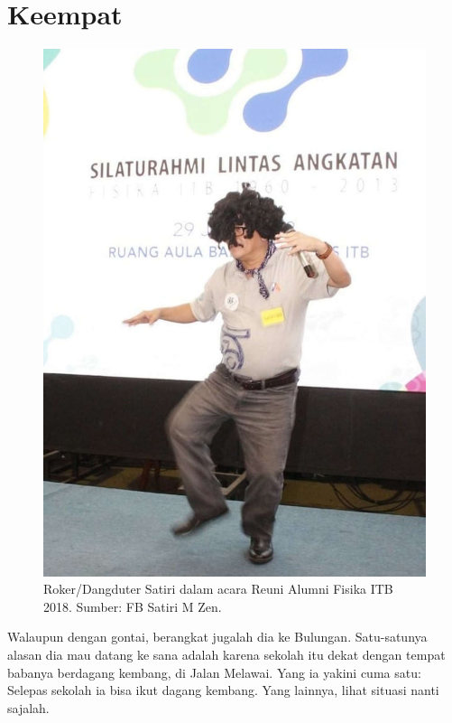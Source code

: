 
\chapter{Keempat}

\begin{figure}[htbp]
\centerline{\includegraphics[scale=1.0]{01-04-01}}
\caption{ Roker/Dangduter Satiri dalam acara Reuni Alumni Fisika ITB 2018. Sumber: FB Satiri M Zen.}
\label{01-04-01}
\end{figure}
%

Walaupun dengan gontai, berangkat jugalah dia ke Bulungan. Satu-satunya alasan dia mau datang ke sana adalah karena sekolah itu dekat dengan tempat babanya berdagang kembang, di Jalan Melawai. Yang ia yakini cuma satu: Selepas sekolah ia bisa ikut dagang kembang. Yang lainnya, lihat situasi nanti sajalah.

